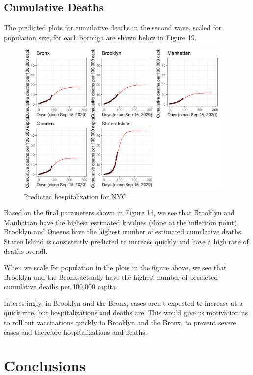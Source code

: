 \documentclass[
]{article}
\begin{document}
\hypertarget{cumulative-deaths-1}{%
\subsection{Cumulative Deaths}\label{cumulative-deaths-1}}

The predicted plots for cumulative deaths in the second wave, scaled for
population size, for each borough are shown below in Figure 19.

\begin{figure}
\centering
\includegraphics[width=4.16667in,height=\textheight]{plots/death_plots/predictive/all_pred.png}
\caption{Predicted hospitalization for NYC}
\end{figure}

Based on the final parameters shown in Figure 14, we see that Brooklyn
and Manhattan have the highest estimated k values (slope at the
inflection point). Brooklyn and Queens have the highest number of
estimated cumulative deaths. Staten Island is consistently predicted to
increase quickly and have a high rate of deaths overall.

When we scale for population in the plots in the figure above, we see
that Brooklyn and the Bronx actually have the highest number of
predicted cumulative deaths per 100,000 capita.

Interestingly, in Brooklyn and the Bronx, cases aren't expected to
increase at a quick rate, but hospitalizations and deaths are. This
would give us motivation us to roll out vaccinations quickly to Brooklyn
and the Bronx, to prevent severe cases and therefore hospitalizations
and deaths.

\hypertarget{conclusions}{%
\section{Conclusions}\label{conclusions}}
\end{document}
